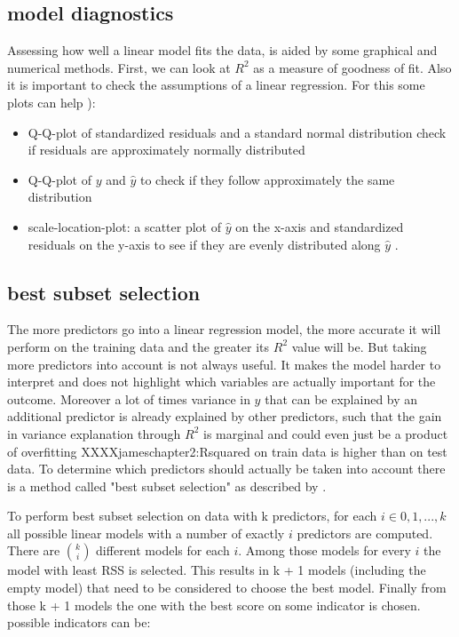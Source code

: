 \documentclass[12 pt]{scrartcl}
\begin{document}
\subsection{model diagnostics}
Assessing how well a linear model fits the data, is aided by some graphical and numerical methods.
First, we can look at $R^2$ as a measure of goodness of fit. Also it is important to check the assumptions of a linear regression. For this some plots can help \citep{Understa39}):
\begin{itemize}
  \item Q-Q-plot of standardized residuals and a standard normal distribution check if residuals are approximately normally distributed
  \item Q-Q-plot of $y$ and $\hat{y}$ to check if they follow approximately the same distribution
  \item scale-location-plot: a scatter plot of $\hat{y}$ on the x-axis and standardized residuals on the y-axis to see if they are evenly distributed along $\hat{y}$ .
\end{itemize}

\subsection{best subset selection}

The more predictors go into a linear regression model, the more accurate it will perform on the training data and the greater its $R^2$ value will be. But taking more predictors into account is not always useful. It makes the model harder to interpret and does not highlight which variables are actually important for the outcome. Moreover a lot of times variance in $y$ that can be explained by an additional predictor is already explained by other predictors, such that the gain in variance explanation through $R^2$ is marginal and could even just be a product of overfitting XXXXjameschapter2:Rsquared on train data is higher than on test data.
To determine which predictors should actually be taken into account there is a method called "best subset selection" as described by \citet[p.~227]{james2013introduction}.

To perform best subset selection on data with k predictors, for each $i \in {0,1,...,k}$ all possible linear models with a number of exactly $i$ predictors are computed. There are ${k}\choose{i}$ different models for each $i$. Among those models for every $i$ the model with least RSS is selected. This results in k + 1 models (including the empty model) that need to be considered to choose the best model. Finally from those  k + 1 models the one with the best score on some indicator is chosen.
possible indicators can be:
\end{document}
